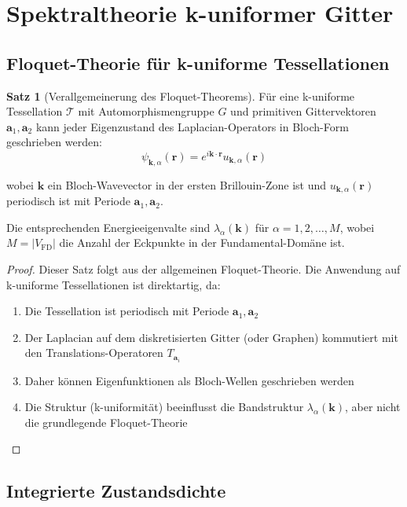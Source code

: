 \documentclass[a4paper,12pt]{article}
\theoremstyle{definition}
\newtheorem{satz}{Satz}[section]
\begin{document}
\section{Spektraltheorie k-uniformer Gitter}

\subsection{Floquet-Theorie für k-uniforme Tessellationen}

\begin{satz}[Verallgemeinerung des Floquet-Theorems]
	Für eine k-uniforme Tessellation $\mathcal{T}$ mit Automorphismengruppe $G$ und primitiven Gittervektoren $\mathbf{a}_1, \mathbf{a}_2$ kann jeder Eigenzustand des Laplacian-Operators in Bloch-Form geschrieben werden:
	\[
	\psi_{\mathbf{k},\alpha}(\mathbf{r}) = e^{i\mathbf{k} \cdot \mathbf{r}} u_{\mathbf{k},\alpha}(\mathbf{r})
	\]
	
	wobei $\mathbf{k}$ ein Bloch-Wavevector in der ersten Brillouin-Zone ist und $u_{\mathbf{k},\alpha}(\mathbf{r})$ periodisch ist mit Periode $\mathbf{a}_1, \mathbf{a}_2$.
	
	Die entsprechenden Energieeigenvalte sind $\lambda_\alpha(\mathbf{k})$ für $\alpha = 1, 2, \ldots, M$, wobei $M = |V_{\text{FD}}|$ die Anzahl der Eckpunkte in der Fundamental-Domäne ist.
\end{satz}

\begin{proof}
	Dieser Satz folgt aus der allgemeinen Floquet-Theorie. Die Anwendung auf k-uniforme Tessellationen ist direktartig, da:
	
	\begin{enumerate}
		\item Die Tessellation ist periodisch mit Periode $\mathbf{a}_1, \mathbf{a}_2$
		\item Der Laplacian auf dem diskretisierten Gitter (oder Graphen) kommutiert mit den Translations-Operatoren $T_{\mathbf{a}_i}$
		\item Daher können Eigenfunktionen als Bloch-Wellen geschrieben werden
		\item Die Struktur (k-uniformität) beeinflusst die Bandstruktur $\lambda_\alpha(\mathbf{k})$, aber nicht die grundlegende Floquet-Theorie
	\end{enumerate}
\end{proof}

\subsection{Integrierte Zustandsdichte}
\end{document}
